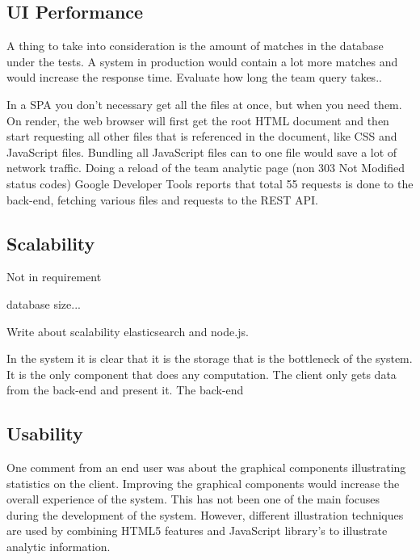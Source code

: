 \subsection{UI Performance}

A thing to take into consideration is the amount of matches in the database under the tests. A system in production would contain a lot more matches and would increase the response time. Evaluate how long the team query takes..

In a \ac{SPA} you don't necessary get all the files at once, but when you need them. On render, the web browser will first get the root \ac{HTML} document and then start requesting all other files that is referenced in the document, like \ac{CSS} and \ac{JavaScript} files. Bundling all JavaScript files can to one file would save a lot of network traffic. Doing a reload of the team analytic page (non 303 Not Modified status codes) Google Developer Tools reports that total 55 requests is done to the back-end, fetching various files and requests to the REST API.

\subsection{Scalability}

Not in requirement

database size...

Write about scalability elasticsearch and node.js.

In the system it is clear that it is the storage that is the bottleneck of the system. It is the only component that does any computation. The client only gets data from the back-end and present it. The back-end 

\subsection{Usability}

One comment from an end user was about the graphical components illustrating statistics on the client. Improving the graphical components would increase the overall experience of the system. This has not been one of the main focuses during the development of the system. However, different illustration techniques are used by combining HTML5 features and JavaScript library's to illustrate analytic information. 










